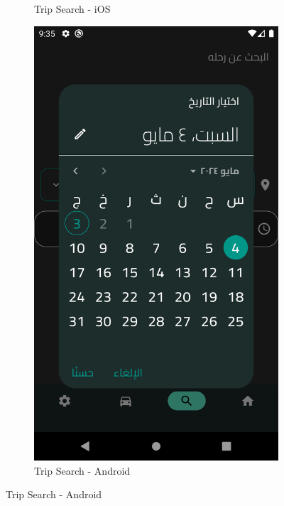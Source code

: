 \documentclass[a4paper, 12pt]{report} %
\begin{document}
\begin{figure}[H]
\begin{subfigure}{0.31\textwidth}
                    \caption{Trip Search - iOS}
                    \label{fig:trip_search_1}
                \end{subfigure}
                \begin{subfigure}{0.31\textwidth}
                    \includegraphics[width=\linewidth]{Images/trip_search_2.png}
                    \caption{Trip Search - Android}
                    \label{fig:trip_search_2}
                \end{subfigure}

\end{figure}
\end{document}
